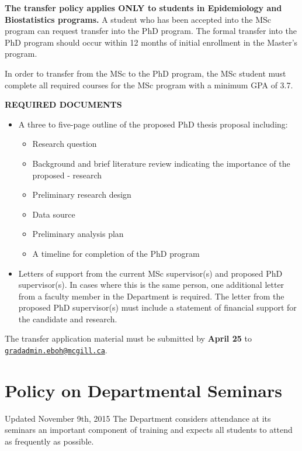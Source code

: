 \documentclass[
]{book}
\providecommand{\tightlist}{%
  \setlength{\itemsep}{0pt}\setlength{\parskip}{0pt}}
\begin{document}
\textbf{The transfer policy applies ONLY to students in Epidemiology and Biostatistics programs.} A student who has been accepted into the MSc program can request transfer into the PhD program. The formal transfer into the PhD program should occur within 12 months of initial enrollment in the Master's program.

In order to transfer from the MSc to the PhD program, the MSc student must complete all required courses for the MSc program with a minimum GPA of 3.7.

\textbf{REQUIRED DOCUMENTS}

\begin{itemize}
\tightlist
\item
  A three to five-page outline of the proposed PhD thesis proposal including:

  \begin{itemize}
  \tightlist
  \item
    Research question
  \item
    Background and brief literature review indicating the importance of the proposed - research
  \item
    Preliminary research design
  \item
    Data source
  \item
    Preliminary analysis plan
  \item
    A timeline for completion of the PhD program\\
  \end{itemize}
\item
  Letters of support from the current MSc supervisor(s) and proposed PhD supervisor(s). In cases where this is the same person, one additional letter from a faculty member in the Department is required. The letter from the proposed PhD supervisor(s) must include a statement of financial support for the candidate and research.
\end{itemize}

The transfer application material must be submitted by \textbf{April 25} to \href{mailto:gradadmin.eboh@mcgill.ca}{\nolinkurl{gradadmin.eboh@mcgill.ca}}.

\hypertarget{policy-on-departmental-seminars}{%
\section{Policy on Departmental Seminars}\label{policy-on-departmental-seminars}}

Updated November 9th, 2015
The Department considers attendance at its seminars an important component of training and expects all students to attend as frequently as possible.
\end{document}

